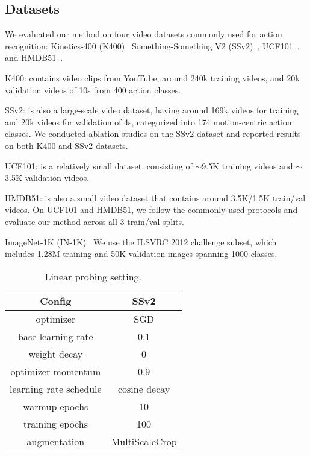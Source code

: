 \subsection{Datasets}

We evaluated our method on four video datasets commonly used for action recognition: 
Kinetics-400 (K400)~\cite{kay2017kinetics} Something-Something V2 (SSv2)~\cite{goyal2017something}, UCF101~\cite{soomro2012ucf101}, and HMDB51~\cite{kuehne2011hmdb}. 

K400: contains video clips from YouTube, around 240k training videos, and 20k validation videos of 10s from 400 action classes.

SSv2: is also a large-scale video dataset, having around 169k videos for training and 20k videos for validation of 4s, categorized into 174 motion-centric action classes. We conducted ablation studies on the SSv2 dataset and reported results on both K400 and SSv2 datasets.

UCF101: is a relatively small dataset, consisting of $\sim$9.5K training videos and $\sim$3.5K validation videos.

HMDB51: is also a small video dataset that contains around 3.5K/1.5K train/val videos. On UCF101 and HMDB51, we follow the commonly used protocols and evaluate our method across all 3 train/val splits. 

ImageNet-1K (IN-1K)~\cite{russakovsky2015imagenet} We use the ILSVRC 2012 challenge subset, which includes 1.28M training and 50K validation images spanning 1000 classes. 




\begin{table}[!h]
\centering
\begin{tabular}[t]{cc}
\toprule
\textbf{Config} & \textbf{SSv2} \\ 
\midrule
optimizer & SGD \\ 
base learning rate & 0.1 \\ 
weight decay & 0 \\ 
optimizer momentum & 0.9 \\ 
learning rate schedule & cosine decay \\
warmup epochs & 10 \\ 
training epochs & 100 \\ 
augmentation & MultiScaleCrop \\ 
\bottomrule
\end{tabular}%

\caption{Linear probing setting.}
\label{tab:linear}
\end{table}


